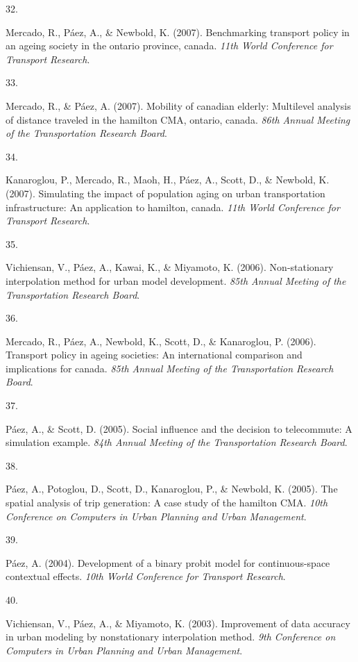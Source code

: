 \documentclass[11pt,a4paper,]{awesome-cv}
\newlength{\cslhangindent}
\newlength{\csllabelwidth}
\newenvironment{CSLReferences}[2] %
 {\begin{list}{}{%
  \setlength{\itemindent}{0pt}
  \setlength{\leftmargin}{0pt}
  \setlength{\parsep}{0pt}
  \ifodd #1
   \setlength{\leftmargin}{\cslhangindent}
   \setlength{\itemindent}{-1\cslhangindent}
  \fi
  \setlength{\itemsep}{#2\baselineskip}}}
 {\end{list}}
\newcommand{\CSLLeftMargin}[1]{\parbox[t]{\csllabelwidth}{\strut#1\strut}}
\newcommand{\CSLRightInline}[1]{\parbox[t]{\linewidth - \csllabelwidth}{\strut#1\strut}}
\begin{document}
\begin{CSLReferences}{0}{0}
\CSLLeftMargin{32. }%
\CSLRightInline{Mercado, R., Páez, A., \& Newbold, K. (2007).
Benchmarking transport policy in an ageing society in the ontario
province, canada. \emph{11th World Conference for Transport Research}.}

\CSLLeftMargin{33. }%
\CSLRightInline{Mercado, R., \& Páez, A. (2007). Mobility of canadian
elderly: Multilevel analysis of distance traveled in the hamilton CMA,
ontario, canada. \emph{86th Annual Meeting of the Transportation
Research Board}.}

\CSLLeftMargin{34. }%
\CSLRightInline{Kanaroglou, P., Mercado, R., Maoh, H., Páez, A., Scott,
D., \& Newbold, K. (2007). Simulating the impact of population aging on
urban transportation infrastructure: An application to hamilton, canada.
\emph{11th World Conference for Transport Research}.}

\CSLLeftMargin{35. }%
\CSLRightInline{Vichiensan, V., Páez, A., Kawai, K., \& Miyamoto, K.
(2006). Non-stationary interpolation method for urban model development.
\emph{85th Annual Meeting of the Transportation Research Board}.}

\CSLLeftMargin{36. }%
\CSLRightInline{Mercado, R., Páez, A., Newbold, K., Scott, D., \&
Kanaroglou, P. (2006). Transport policy in ageing societies: An
international comparison and implications for canada. \emph{85th Annual
Meeting of the Transportation Research Board}.}

\CSLLeftMargin{37. }%
\CSLRightInline{Páez, A., \& Scott, D. (2005). Social influence and the
decision to telecommute: A simulation example. \emph{84th Annual Meeting
of the Transportation Research Board}.}

\CSLLeftMargin{38. }%
\CSLRightInline{Páez, A., Potoglou, D., Scott, D., Kanaroglou, P., \&
Newbold, K. (2005). The spatial analysis of trip generation: A case
study of the hamilton CMA. \emph{10th Conference on Computers in Urban
Planning and Urban Management}.}

\CSLLeftMargin{39. }%
\CSLRightInline{Páez, A. (2004). Development of a binary probit model
for continuous-space contextual effects. \emph{10th World Conference for
Transport Research}.}

\CSLLeftMargin{40. }%
\CSLRightInline{Vichiensan, V., Páez, A., \& Miyamoto, K. (2003).
Improvement of data accuracy in urban modeling by nonstationary
interpolation method. \emph{9th Conference on Computers in Urban
Planning and Urban Management}.}


\end{CSLReferences}
\end{document}
